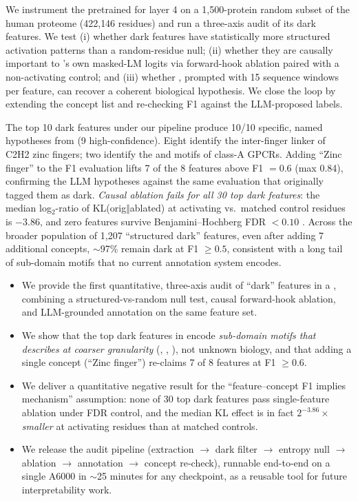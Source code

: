  We instrument the pretrained \interplm \sae for \esm layer 4 on a 1{,}500-protein random subset of the human \swissprot proteome (422{,}146 residues) and run a three-axis audit of its dark features. We test (i) whether dark features have statistically more structured activation patterns than a random-residue null; (ii) whether they are causally important to \esm's own masked-LM logits via forward-hook ablation paired with a non-activating control; and (iii) whether \gptfive, prompted with 15 sequence windows per feature, can recover a coherent biological hypothesis. We close the loop by extending the concept list and re-checking F1 against the LLM-proposed labels.

 The top 10 dark features under our pipeline produce 10/10 specific, named hypotheses from \gptfive (9 high-confidence). Eight identify the \tgekp inter-finger linker of C2H2 zinc fingers; two identify the \dry and \npxxy motifs of class-A GPCRs. Adding ``Zinc finger'' to the F1 evaluation lifts 7 of the 8 features above F1 $= 0.6$ (max 0.84), confirming the LLM hypotheses against the same evaluation that originally tagged them as dark. \emph{Causal ablation fails for all 30 top dark features}: the median log$_2$-ratio of KL(orig$\Vert$ablated) at activating vs.\ matched control residues is $-3.86$, and zero features survive Benjamini--Hochberg FDR $< 0.10$ \citep{benjamini1995fdr}. Across the broader population of 1{,}207 ``structured dark'' features, even after adding 7 additional concepts, $\sim$97\% remain dark at F1 $\geq 0.5$, consistent with a long tail of sub-domain motifs that no current annotation system encodes.

\begin{itemize}[leftmargin=*,itemsep=0pt,topsep=0pt]
    \item We provide the first quantitative, three-axis audit of ``dark'' \sae features in a \plm, combining a structured-vs-random null test, causal forward-hook ablation, and LLM-grounded annotation on the same feature set.
    \item We show that the top dark features in \esm encode \emph{sub-domain motifs that \swissprot describes at coarser granularity} (\tgekp, \dry, \npxxy), not unknown biology, and that adding a single concept (``Zinc finger'') re-claims 7 of 8 features at F1 $\geq 0.6$.
    \item We deliver a quantitative negative result for the ``feature--concept F1 implies mechanism'' assumption: none of 30 top dark features pass single-feature ablation under FDR control, and the median KL effect is in fact $2^{-3.86}\times$ \emph{smaller} at activating residues than at matched controls.
    \item We release the audit pipeline (\sae extraction $\rightarrow$ dark filter $\rightarrow$ entropy null $\rightarrow$ ablation $\rightarrow$ \gptfive annotation $\rightarrow$ concept re-check), runnable end-to-end on a single A6000 in $\sim$25 minutes for any \interplm checkpoint, as a reusable tool for future \plm interpretability work.
\end{itemize}

